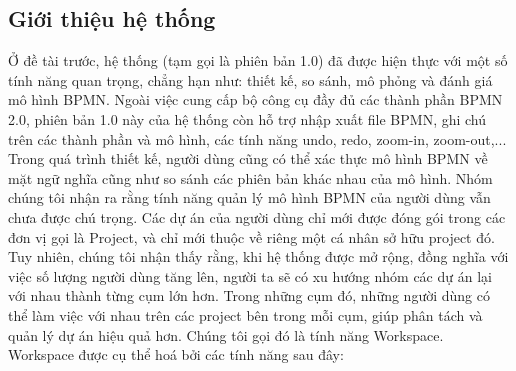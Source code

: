 \subsection{Giới thiệu hệ thống}
Ở đề tài trước, hệ thống (tạm gọi là phiên bản 1.0) đã được hiện thực với một số tính năng quan trọng, chẳng hạn như: thiết kế, so sánh, mô phỏng và đánh giá mô hình BPMN. Ngoài việc cung cấp bộ công cụ đầy đủ các thành phần BPMN 2.0, phiên bản 1.0 này của hệ thống còn hỗ trợ nhập xuất file BPMN, ghi chú trên các thành phần và mô hình, các tính năng undo, redo, zoom-in, zoom-out,... Trong quá trình thiết kế, người dùng cũng có thể xác thực mô hình BPMN về mặt ngữ nghĩa cũng như so sánh các phiên bản khác nhau của mô hình.
\newline
Nhóm chúng tôi nhận ra rằng tính năng quản lý mô hình BPMN của người dùng vẫn chưa được chú trọng. Các dự án của người dùng chỉ mới được đóng gói trong các đơn vị gọi là Project, và chỉ mới thuộc về riêng một cá nhân sở hữu project đó. Tuy nhiên, chúng tôi nhận thấy rằng, khi hệ thống được mở rộng, đồng nghĩa với việc số lượng người dùng tăng lên, người ta sẽ có xu hướng nhóm các dự án lại với nhau thành từng cụm lớn hơn. Trong những cụm đó, những người dùng có thể làm việc với nhau trên các project bên trong mỗi cụm, giúp phân tách và quản lý dự án hiệu quả hơn. Chúng tôi gọi đó là tính năng Workspace. 
\newline
Workspace được cụ thể hoá bởi các tính năng sau đây:
